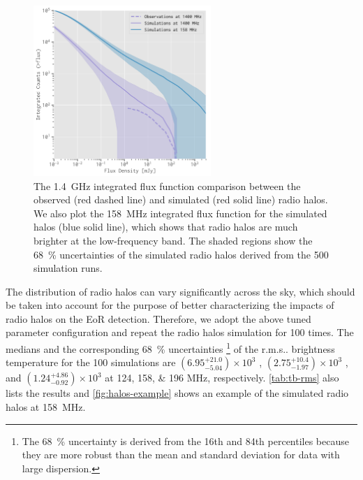 \documentclass[modern]{aastex62}
\makeatletter
\newcommand{\rms}{r.m.s\@ifnextchar.{}{.\@}}
\makeatother
\begin{document}
\begin{figure}
  \centering
  \includegraphics[width=0.6\textwidth]{fluxfunc-simucomp-1400}
  \caption{\label{fig:halos-simucomp}%
    The \SI{1.4}{\GHz} integrated flux function comparison
    between the observed (red dashed line) and simulated (red solid line)
    radio halos.  We also plot the \SI{158}{\MHz} integrated flux function
    for the simulated halos (blue solid line), which shows that radio
    halos are much brighter at the low-frequency band.  The shaded
    regions show the \SI{68}{\percent} uncertainties of the simulated
    radio halos derived from the 500 simulation runs.
  }
\end{figure}

{\color{cyan}%
The distribution of radio halos can vary significantly across the sky,
which should be taken into account for the purpose of better
characterizing the impacts of radio halos on the EoR detection.
Therefore, we adopt the above tuned parameter configuration
and repeat the radio halos simulation for 100 times.
The medians and the corresponding \SI{68}{\percent} uncertainties%
\footnote{The \SI{68}{\percent} uncertainty is derived from the 16th
and 84th percentiles because they are more robust than the mean and
standard deviation for data with large dispersion.}
of the \rms{} brightness temperature for the 100 simulations are
$\left(6.95_{-5.04}^{+21.0}\right) \times 10^3$ \si{\mK},
$\left(2.75_{-1.97}^{+10.4}\right) \times 10^3$ \si{\mK}, and
$\left(1.24_{-0.92}^{+4.86}\right) \times 10^3$ \si{\mK}
at \numlist{124;158;196} \si{\MHz}, respectively.
\autoref{tab:tb-rms} also lists the results and
\autoref{fig:halos-example} shows an example of the simulated radio halos
at \SI{158}{\MHz}.} %
\end{document}
